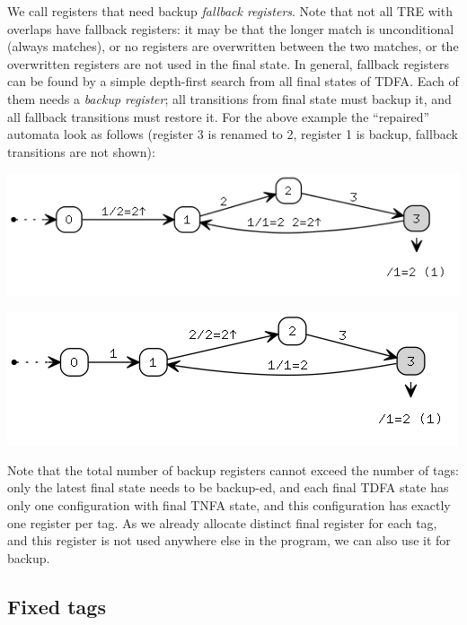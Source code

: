 \documentclass{article}
\newenvironment{Xfig}
    {\par\medskip\noindent\minipage{\linewidth}\begin{center}}
    {\end{center}\endminipage\par\medskip}
\theoremstyle{definition}
\begin{document}
\begin{multicols}{2}
We call registers that need backup \emph{fallback registers}.
Note that not all TRE with overlaps have fallback registers:
it may be that the longer match is unconditional (always matches),
or no registers are overwritten between the two matches,
or the overwritten registers are not used in the final state.
In general, fallback registers can be found by a simple depth-first search from all final states of TDFA.
Each of them needs a \emph{backup register};
all transitions from final state must backup it, and all fallback transitions must restore it.
For the above example the ``repaired'' automata look as follows
(register 3 is renamed to 2, register 1 is backup, fallback transitions are not shown):

\begin{Xfig}
\includegraphics[width=\linewidth]{img/fallback_tdfa0_fallback.png}
\end{Xfig}

\begin{Xfig}
\includegraphics[width=\linewidth]{img/fallback_tdfa1_fallback.png}
\end{Xfig}

Note that the total number of backup registers cannot exceed the number of tags:
only the latest final state needs to be backup-ed,
and each final TDFA state has only one configuration with final TNFA state,
and this configuration has exactly one register per tag.
As we already allocate distinct final register for each tag,
and this register is not used anywhere else in the program,
we can also use it for backup.

\subsection*{Fixed tags}


\end{multicols}
\end{document}
